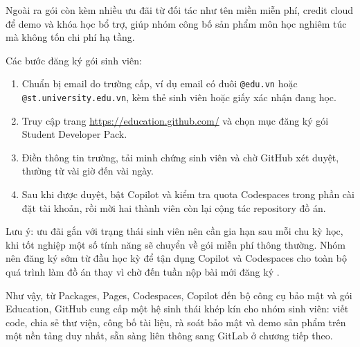 Ngoài ra gói còn kèm nhiều ưu đãi từ đối tác như tên miền miễn phí, credit
cloud để demo và khóa học bổ trợ, giúp nhóm công bố sản phẩm môn học nghiêm túc
mà không tốn chi phí hạ tầng.

Các bước đăng ký gói sinh viên:

\begin{enumerate}
\item Chuẩn bị email do trường cấp, ví dụ email có đuôi \verb|@edu.vn| hoặc
\verb|@st.university.edu.vn|, kèm thẻ sinh viên hoặc giấy xác nhận đang học.
\item Truy cập trang \url{https://education.github.com/} và chọn mục đăng ký
gói Student Developer Pack.
\item Điền thông tin trường, tải minh chứng sinh viên và chờ GitHub xét duyệt,
thường từ vài giờ đến vài ngày.
\item Sau khi được duyệt, bật Copilot và kiểm tra quota Codespaces trong phần
cài đặt tài khoản, rồi mời hai thành viên còn lại cộng tác repository đồ án.
\end{enumerate}

Lưu ý: ưu đãi gắn với trạng thái sinh viên nên cần gia hạn sau mỗi chu kỳ học,
khi tốt nghiệp một số tính năng sẽ chuyển về gói miễn phí thông thường.
Nhóm nên đăng ký sớm từ đầu học kỳ để tận dụng Copilot và Codespaces cho toàn bộ
quá trình làm đồ án thay vì chờ đến tuần nộp bài mới đăng ký \cite{githubdocs}.

Như vậy, từ Packages, Pages, Codespaces, Copilot đến bộ công cụ bảo mật và gói
Education, GitHub cung cấp một hệ sinh thái khép kín cho nhóm sinh viên: viết code,
chia sẻ thư viện, công bố tài liệu, rà soát bảo mật và demo sản phẩm trên một
nền tảng duy nhất, sẵn sàng liên thông sang GitLab ở chương tiếp theo.
